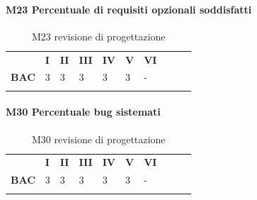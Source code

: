 \paragraph{M23 Percentuale di requisiti opzionali soddisfatti} \mbox{}
\begin{longtable}[H!] {						
		>{}p{50mm}  		
		>{}p{8mm}
		>{}p{8mm}		
		>{}p{8mm}		
		>{}p{8mm}		
		>{}p{8mm}		
		>{}p{8mm}
		>{}p{8mm}
		>{}p{8mm}
		>{}p{8mm}
	}
	\rowcolor{gray!50}
	\textbf{} & \textbf{I} & \textbf{II} & \textbf{III} & \textbf{IV} & \textbf{V} & \textbf{VI} \TBstrut \\ [2mm]
	\textbf{BAC} & 3 & 3 & 3 & 3 & 3 & - \TBstrut \\ [2mm]
	\rowcolor{white}
	\caption{M23 revisione di progettazione}
\end{longtable}
\paragraph{M30 Percentuale bug sistemati} \mbox{}
\begin{longtable}[H!] {						
		>{}p{50mm}  		
		>{}p{8mm}
		>{}p{8mm}		
		>{}p{8mm}		
		>{}p{8mm}		
		>{}p{8mm}		
		>{}p{8mm}
		>{}p{8mm}
		>{}p{8mm}
		>{}p{8mm}
	}
	\rowcolor{gray!50}
	\textbf{} & \textbf{I} & \textbf{II} & \textbf{III} & \textbf{IV} & \textbf{V} & \textbf{VI} \TBstrut \\ [2mm]
	\textbf{BAC} & 3 & 3 & 3 & 3 & 3 & - \TBstrut \\ [2mm]
	\rowcolor{white}
	\caption{M30 revisione di progettazione}
\end{longtable}
